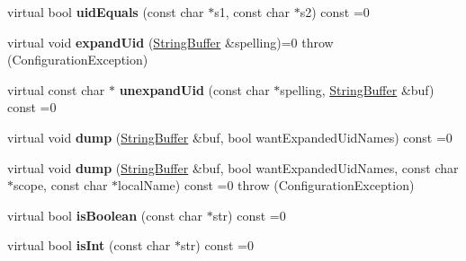\begin{DoxyCompactItemize}
\item 
\hypertarget{classCONFIG4CPP__NAMESPACE_1_1Configuration_a968327608bf4387631d11680351c25b4}{virtual bool {\bfseries uid\-Equals} (const char $\ast$s1, const char $\ast$s2) const =0}\label{classCONFIG4CPP__NAMESPACE_1_1Configuration_a968327608bf4387631d11680351c25b4}

\item 
\hypertarget{classCONFIG4CPP__NAMESPACE_1_1Configuration_adb4c381219440ecb32f5be2befc463f4}{virtual void {\bfseries expand\-Uid} (\hyperlink{classCONFIG4CPP__NAMESPACE_1_1StringBuffer}{String\-Buffer} \&spelling)=0  throw (\-Configuration\-Exception)}\label{classCONFIG4CPP__NAMESPACE_1_1Configuration_adb4c381219440ecb32f5be2befc463f4}

\item 
\hypertarget{classCONFIG4CPP__NAMESPACE_1_1Configuration_a261d0010d8b27a46991a9feccc916c9c}{virtual const char $\ast$ {\bfseries unexpand\-Uid} (const char $\ast$spelling, \hyperlink{classCONFIG4CPP__NAMESPACE_1_1StringBuffer}{String\-Buffer} \&buf) const =0}\label{classCONFIG4CPP__NAMESPACE_1_1Configuration_a261d0010d8b27a46991a9feccc916c9c}

\item 
\hypertarget{classCONFIG4CPP__NAMESPACE_1_1Configuration_aa7dfe8b35c1cd9d7d18ff62de1894582}{virtual void {\bfseries dump} (\hyperlink{classCONFIG4CPP__NAMESPACE_1_1StringBuffer}{String\-Buffer} \&buf, bool want\-Expanded\-Uid\-Names) const =0}\label{classCONFIG4CPP__NAMESPACE_1_1Configuration_aa7dfe8b35c1cd9d7d18ff62de1894582}

\item 
\hypertarget{classCONFIG4CPP__NAMESPACE_1_1Configuration_a0c705b81a30495e9790ba24e17307819}{virtual void {\bfseries dump} (\hyperlink{classCONFIG4CPP__NAMESPACE_1_1StringBuffer}{String\-Buffer} \&buf, bool want\-Expanded\-Uid\-Names, const char $\ast$scope, const char $\ast$local\-Name) const =0  throw (\-Configuration\-Exception)}\label{classCONFIG4CPP__NAMESPACE_1_1Configuration_a0c705b81a30495e9790ba24e17307819}

\item 
\hypertarget{classCONFIG4CPP__NAMESPACE_1_1Configuration_a5ec6d5ccda2d6aab3c131d1393ece28b}{virtual bool {\bfseries is\-Boolean} (const char $\ast$str) const =0}\label{classCONFIG4CPP__NAMESPACE_1_1Configuration_a5ec6d5ccda2d6aab3c131d1393ece28b}

\item 
\hypertarget{classCONFIG4CPP__NAMESPACE_1_1Configuration_afed6a132f859dbdde3e813817f0dfd99}{virtual bool {\bfseries is\-Int} (const char $\ast$str) const =0}\label{classCONFIG4CPP__NAMESPACE_1_1Configuration_afed6a132f859dbdde3e813817f0dfd99}


\end{DoxyCompactItemize}
